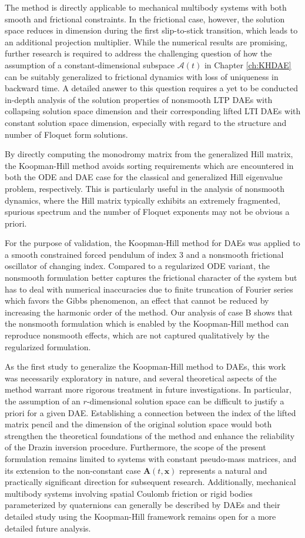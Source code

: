 \documentclass[a4paper, nonatbib, 3p, twocolumn]{elsarticle}
\theoremstyle{plain}
\theoremstyle{definition}
\theoremstyle{remark}
\newcommand{\vx}{\mathbf x}
\newcommand{\vA}{\mathbf A}
\newcommand{\cA}{\mathcal{A}}
\begin{document}
The method is directly applicable to mechanical multibody systems with both smooth and frictional constraints. In the frictional case, however, the solution space reduces in dimension during the first slip-to-stick transition, which leads to an additional projection multiplier. While the numerical results are promising, further research is required to address the challenging question of how the assumption of a constant-dimensional subspace $\cA(t)$ in Chapter \ref{ch:KHDAE} can be suitably generalized to frictional dynamics with loss of uniqueness in backward time.  A detailed answer to this question requires a yet to be conducted in-depth analysis of the solution properties of nonsmooth LTP DAEs with collapsing solution space dimension and their corresponding lifted LTI DAEs with constant solution space dimension, especially with regard to the structure and number of Floquet form solutions. 

By directly computing the monodromy matrix from the generalized Hill matrix, the Koopman-Hill method avoids sorting requirements which are encountered in both the ODE and DAE case for the classical and generalized Hill eigenvalue problem, respectively.
This is particularly useful in the analysis of nonsmooth dynamics, where the Hill matrix typically exhibits an extremely fragmented, spurious spectrum and the number of Floquet exponents may not be obvious a priori.

For the purpose of validation, the Koopman-Hill method for DAEs was applied to a smooth constrained forced pendulum of index 3 and a nonsmooth frictional oscillator of changing index.
Compared to a regularized ODE variant, the nonsmooth formulation better captures the frictional character of the system but has to deal with numerical inaccuracies due to finite truncation of Fourier series which favors the Gibbs phenomenon, an effect that cannot be reduced by increasing the harmonic order of the method.
Our analysis of case B shows that the nonsmooth formulation which is enabled by the Koopman-Hill method can reproduce nonsmooth effects, which are not captured qualitatively by the regularized formulation.

As the first study to generalize the Koopman-Hill method to DAEs, this work was necessarily exploratory in nature, and several theoretical aspects of the method warrant more rigorous treatment in future investigations. In particular, the assumption of an $r$-dimensional solution space can be difficult to justify a priori for a given DAE. Establishing a connection between the index of the lifted matrix pencil and the dimension of the original solution space would both strengthen the theoretical foundations of the method and enhance the reliability of the Drazin inversion procedure. Furthermore, the scope of the present formulation remains limited to systems with constant pseudo-mass matrices, and its extension to the non-constant case $\vA(t,\vx)$ represents a natural and practically significant direction for subsequent research. Additionally, mechanical multibody systems involving spatial Coulomb friction or rigid bodies parameterized by quaternions can generally be described by DAEs and their detailed study using the Koopman-Hill framework remains open for a more detailed future analysis.
\end{document}
